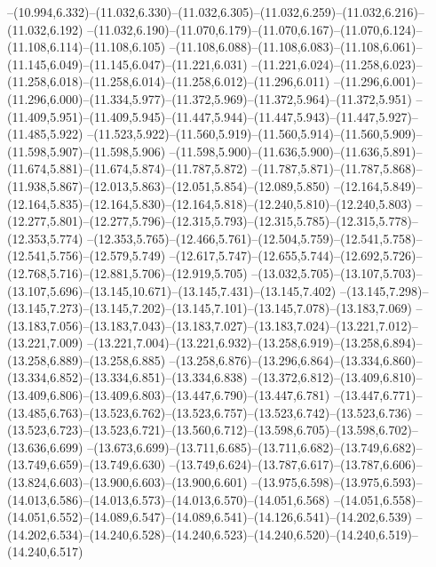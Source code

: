  --(10.994,6.332)--(11.032,6.330)--(11.032,6.305)--(11.032,6.259)--(11.032,6.216)--(11.032,6.192)%
  --(11.032,6.190)--(11.070,6.179)--(11.070,6.167)--(11.070,6.124)--(11.108,6.114)--(11.108,6.105)%
  --(11.108,6.088)--(11.108,6.083)--(11.108,6.061)--(11.145,6.049)--(11.145,6.047)--(11.221,6.031)%
  --(11.221,6.024)--(11.258,6.023)--(11.258,6.018)--(11.258,6.014)--(11.258,6.012)--(11.296,6.011)%
  --(11.296,6.001)--(11.296,6.000)--(11.334,5.977)--(11.372,5.969)--(11.372,5.964)--(11.372,5.951)%
  --(11.409,5.951)--(11.409,5.945)--(11.447,5.944)--(11.447,5.943)--(11.447,5.927)--(11.485,5.922)%
  --(11.523,5.922)--(11.560,5.919)--(11.560,5.914)--(11.560,5.909)--(11.598,5.907)--(11.598,5.906)%
  --(11.598,5.900)--(11.636,5.900)--(11.636,5.891)--(11.674,5.881)--(11.674,5.874)--(11.787,5.872)%
  --(11.787,5.871)--(11.787,5.868)--(11.938,5.867)--(12.013,5.863)--(12.051,5.854)--(12.089,5.850)%
  --(12.164,5.849)--(12.164,5.835)--(12.164,5.830)--(12.164,5.818)--(12.240,5.810)--(12.240,5.803)%
  --(12.277,5.801)--(12.277,5.796)--(12.315,5.793)--(12.315,5.785)--(12.315,5.778)--(12.353,5.774)%
  --(12.353,5.765)--(12.466,5.761)--(12.504,5.759)--(12.541,5.758)--(12.541,5.756)--(12.579,5.749)%
  --(12.617,5.747)--(12.655,5.744)--(12.692,5.726)--(12.768,5.716)--(12.881,5.706)--(12.919,5.705)%
  --(13.032,5.705)--(13.107,5.703)--(13.107,5.696)--(13.145,10.671)--(13.145,7.431)--(13.145,7.402)%
  --(13.145,7.298)--(13.145,7.273)--(13.145,7.202)--(13.145,7.101)--(13.145,7.078)--(13.183,7.069)%
  --(13.183,7.056)--(13.183,7.043)--(13.183,7.027)--(13.183,7.024)--(13.221,7.012)--(13.221,7.009)%
  --(13.221,7.004)--(13.221,6.932)--(13.258,6.919)--(13.258,6.894)--(13.258,6.889)--(13.258,6.885)%
  --(13.258,6.876)--(13.296,6.864)--(13.334,6.860)--(13.334,6.852)--(13.334,6.851)--(13.334,6.838)%
  --(13.372,6.812)--(13.409,6.810)--(13.409,6.806)--(13.409,6.803)--(13.447,6.790)--(13.447,6.781)%
  --(13.447,6.771)--(13.485,6.763)--(13.523,6.762)--(13.523,6.757)--(13.523,6.742)--(13.523,6.736)%
  --(13.523,6.723)--(13.523,6.721)--(13.560,6.712)--(13.598,6.705)--(13.598,6.702)--(13.636,6.699)%
  --(13.673,6.699)--(13.711,6.685)--(13.711,6.682)--(13.749,6.682)--(13.749,6.659)--(13.749,6.630)%
  --(13.749,6.624)--(13.787,6.617)--(13.787,6.606)--(13.824,6.603)--(13.900,6.603)--(13.900,6.601)%
  --(13.975,6.598)--(13.975,6.593)--(14.013,6.586)--(14.013,6.573)--(14.013,6.570)--(14.051,6.568)%
  --(14.051,6.558)--(14.051,6.552)--(14.089,6.547)--(14.089,6.541)--(14.126,6.541)--(14.202,6.539)%
  --(14.202,6.534)--(14.240,6.528)--(14.240,6.523)--(14.240,6.520)--(14.240,6.519)--(14.240,6.517)%
